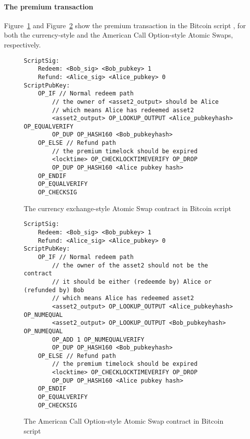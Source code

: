 \paragraph{The premium transaction}
Figure~\ref{code:bitcoin_contract_currency_exchange} and Figure~\ref{code:bitcoin_contract_option} show the premium transaction in the Bitcoin script
, for both the currency-style and the American Call Option-style Atomic Swaps, respectively.

\begin{figure}
\begin{lstlisting}[language=Solidity, basicstyle=\tiny]
ScriptSig:
    Redeem: <Bob_sig> <Bob_pubkey> 1
    Refund: <Alice_sig> <Alice_pubkey> 0
ScriptPubKey:
    OP_IF // Normal redeem path
        // the owner of <asset2_output> should be Alice
        // which means Alice has redeemed asset2
        <asset2_output> OP_LOOKUP_OUTPUT <Alice_pubkeyhash> OP_EQUALVERIFY 
        OP_DUP OP_HASH160 <Bob_pubkeyhash>
    OP_ELSE // Refund path
        // the premium timelock should be expired
        <locktime> OP_CHECKLOCKTIMEVERIFY OP_DROP
        OP_DUP OP_HASH160 <Alice pubkey hash>
    OP_ENDIF
    OP_EQUALVERIFY
    OP_CHECKSIG
\end{lstlisting}
\label{code:bitcoin_contract_currency_exchange}
\caption{The currency exchange-style Atomic Swap contract in Bitcoin script}
\end{figure}

\begin{figure}
\begin{lstlisting}[language=Solidity, basicstyle=\tiny]
ScriptSig:
    Redeem: <Bob_sig> <Bob_pubkey> 1
    Refund: <Alice_sig> <Alice_pubkey> 0
ScriptPubKey:
    OP_IF // Normal redeem path
        // the owner of the asset2 should not be the contract
        // it should be either (redeemde by) Alice or (refunded by) Bob
        // which means Alice has redeemed asset2
        <asset2_output> OP_LOOKUP_OUTPUT <Alice_pubkeyhash> OP_NUMEQUAL
        <asset2_output> OP_LOOKUP_OUTPUT <Bob_pubkeyhash> OP_NUMEQUAL
        OP_ADD 1 OP_NUMEQUALVERIFY
        OP_DUP OP_HASH160 <Bob_pubkeyhash>
    OP_ELSE // Refund path
        // the premium timelock should be expired
        <locktime> OP_CHECKLOCKTIMEVERIFY OP_DROP
        OP_DUP OP_HASH160 <Alice pubkey hash>
    OP_ENDIF
    OP_EQUALVERIFY
    OP_CHECKSIG
\end{lstlisting}
\label{code:bitcoin_contract_option}
\caption{The American Call Option-style Atomic Swap contract in Bitcoin script}
\end{figure}

